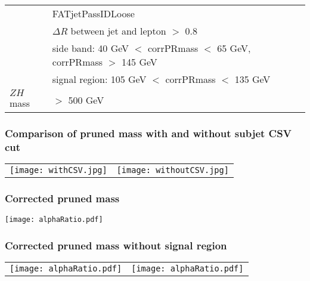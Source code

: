 \documentclass[aspectratio=169]{beamer}
\begin{document}
\begin{frame}
\begin{tiny}
\begin{center}
\begin{tabular}[t]{ | l | l | }
        & FATjetPassIDLoose                              \\
        & $\Delta R$ between jet and lepton $>$ 0.8      \\
        & side band: 40 GeV $<$ corrPRmass $<$ 65 GeV, corrPRmass $>$ 145 GeV \\
        & signal region: 105 GeV $<$ corrPRmass $<$ 135 GeV \\
        \hline
        $ZH$ mass                 
        & $>$ 500 GeV                                    \\
        \hline      
      \end{tabular}
    \end{center}   
  \end{tiny}
\end{frame}
\begin{frame}
  \frametitle{Comparison of pruned mass with and without subjet CSV cut}
  \begin{center}
    \begin{tabular}{ll}
      \texttt{[image: withCSV.jpg]} &
      \texttt{[image: withoutCSV.jpg]} \\
    \end{tabular}
  \end{center}
\end{frame}
\begin{frame}
  \frametitle{Corrected pruned mass}
  \begin{center}
    \texttt{[image: alphaRatio.pdf]}
  \end{center}
\end{frame}
\begin{frame}
  \frametitle{Corrected pruned mass without signal region}
  \begin{center}
    \begin{tabular}{ll}
      \texttt{[image: alphaRatio.pdf]} &
      \texttt{[image: alphaRatio.pdf]} \\
    \end{tabular}
  \end{center}
\end{frame}
\end{document}
